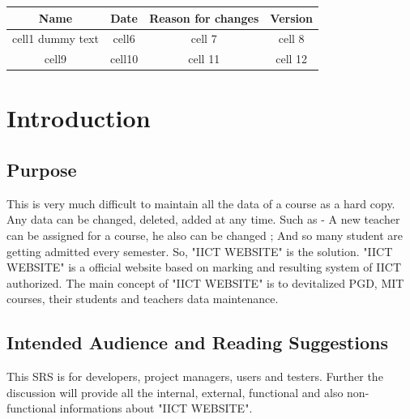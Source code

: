 \documentclass{scrreprt}
\begin{document}
\begin{center}
\begin{tabular}{ | c | c | c | c | } 
  \hline
  Name & Date & Reason for changes & Version \\
  \hline\hline
  cell1 dummy text & cell6 & cell 7 & cell 8\\ 
  \hline
  cell9 & cell10 & cell 11 & cell 12\\ 
  \hline
\end{tabular}
\end{center}

\pagestyle{fancy}
\fancyhead{} %

\chapter{Introduction}
\setcounter{page}{4}
\section{Purpose}
This is very much difficult to maintain all the data of a course as a hard copy. Any data can be changed, deleted, added at any time. Such as - A new teacher can be assigned for a course, he also can be changed ; And so many student are getting admitted every semester. So, "IICT WEBSITE" is the solution. "IICT WEBSITE" is a official website based on marking and resulting system of IICT authorized. The main concept of "IICT WEBSITE" is to devitalized PGD, MIT courses, their students and teachers data maintenance. 

\section{Intended Audience and Reading Suggestions}
This SRS is for developers, project managers, users and testers. Further the discussion will provide all the internal, external, functional and also non-functional informations about "IICT WEBSITE".
\end{document}
